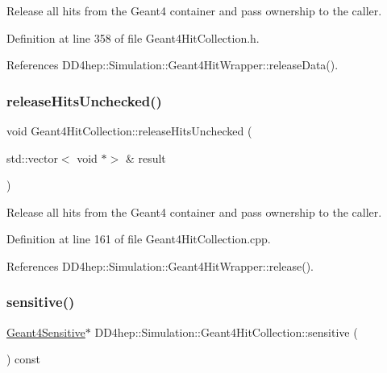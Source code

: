 Release all hits from the Geant4 container and pass ownership to the caller. 



Definition at line 358 of file Geant4\+Hit\+Collection.\+h.



References D\+D4hep\+::\+Simulation\+::\+Geant4\+Hit\+Wrapper\+::release\+Data().

\hypertarget{class_d_d4hep_1_1_simulation_1_1_geant4_hit_collection_a720c9fea086f4c4ae778f371ed778b44}{}\label{class_d_d4hep_1_1_simulation_1_1_geant4_hit_collection_a720c9fea086f4c4ae778f371ed778b44} 
\subsubsection{\texorpdfstring{release\+Hits\+Unchecked()}{releaseHitsUnchecked()}}
{\footnotesize\ttfamily void Geant4\+Hit\+Collection\+::release\+Hits\+Unchecked (\begin{DoxyParamCaption}\item[{std\+::vector$<$ void $\ast$$>$ \&}]{result }\end{DoxyParamCaption})}



Release all hits from the Geant4 container and pass ownership to the caller. 



Definition at line 161 of file Geant4\+Hit\+Collection.\+cpp.



References D\+D4hep\+::\+Simulation\+::\+Geant4\+Hit\+Wrapper\+::release().

\hypertarget{class_d_d4hep_1_1_simulation_1_1_geant4_hit_collection_a5ea6233e9c0a4534b830c87d71151cb0}{}\label{class_d_d4hep_1_1_simulation_1_1_geant4_hit_collection_a5ea6233e9c0a4534b830c87d71151cb0} 
\subsubsection{\texorpdfstring{sensitive()}{sensitive()}}
{\footnotesize\ttfamily \hyperlink{class_d_d4hep_1_1_simulation_1_1_geant4_sensitive}{Geant4\+Sensitive}$\ast$ D\+D4hep\+::\+Simulation\+::\+Geant4\+Hit\+Collection\+::sensitive (\begin{DoxyParamCaption}{ }\end{DoxyParamCaption}) const\hspace{0.3cm}{\ttfamily [inline]}}



